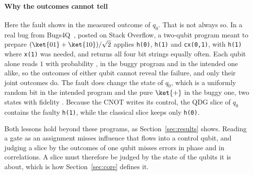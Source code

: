 \paragraph*{Why the outcomes cannot tell}
Here the fault shows in the measured outcome of $q_0$. That is not always so. In a real bug from
Bugs4Q~\cite{zhao2023bugs4q}, posted on Stack Overflow, a two-qubit program meant to prepare
$(\ket{01}+\ket{10})/\sqrt{2}$ applies \texttt{h(0)}, \texttt{h(1)} and \texttt{cx(0,1)}, with \texttt{h(1)} where
\texttt{x(1)} was needed, and returns all four bit strings equally often. Each qubit alone reads $1$ with probability
\numMotPOne{}, in the buggy program and in the intended one alike, so the outcomes of either qubit cannot reveal the
failure, and only their joint outcomes do. The fault does change the state of $q_0$, which is a uniformly random bit in
the intended program and the pure $\ket{+}$ in the buggy one, two states with fidelity \numMotFidelity{}. Because the
CNOT writes its control, the QDG slice of $q_0$ contains the faulty \texttt{h(1)}, while the classical slice keeps only
\texttt{h(0)}.

Both lessons hold beyond these programs, as Section~\ref{sec:results} shows. Reading a gate as an assignment misses
influence that flows into a control qubit, and judging a slice by the outcomes of one qubit misses errors in phase and
in correlations. A slice must therefore be judged by the state of the qubits it is about, which is how
Section~\ref{sec:core} defines it.
